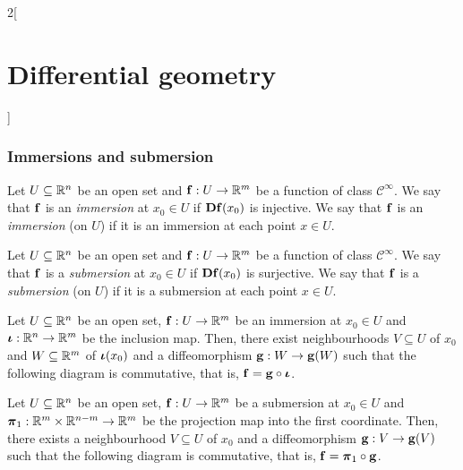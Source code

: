 \documentclass[../../../main.tex]{subfiles}
\begin{document}
\begin{multicols}{2}[\section{Differential geometry}]
  \subsubsection{Immersions and submersion}
  \begin{definition}[Immersion]
    Let $U\subseteq\mathbb{R}^n$ be an open set and $\boldsymbol{\mathrm{f}}:U\rightarrow \mathbb{R}^m$ be a function of class $\mathcal{C}^\infty$. We say that $\boldsymbol{\mathrm{f}}$ is an \emph{immersion} at $x_0\in U$ if $\boldsymbol{\mathrm{Df}}(x_0)$ is injective. We say that $\boldsymbol{\mathrm{f}}$ is an \emph{immersion} (on $U$) if it is an immersion at each point $x\in U$.
  \end{definition}
  \begin{definition}[Submersion]
    Let $U\subseteq\mathbb{R}^n$ be an open set and $\boldsymbol{\mathrm{f}}:U\rightarrow \mathbb{R}^m$ be a function of class $\mathcal{C}^\infty$. We say that $\boldsymbol{\mathrm{f}}$ is a \emph{submersion} at $x_0\in U$ if $\boldsymbol{\mathrm{Df}}(x_0)$ is surjective. We say that $\boldsymbol{\mathrm{f}}$ is a \emph{submersion} (on $U$) if it is a submersion at each point $x\in U$.
  \end{definition}
  \begin{theorem}
    Let $U\subseteq\mathbb{R}^n$ be an open set, $\boldsymbol{\mathrm{f}}:U\rightarrow \mathbb{R}^m$ be an immersion at $x_0\in U$ and $\boldsymbol{\mathrm{\iota}}:\mathbb{R}^n\rightarrow\mathbb{R}^m$ be the inclusion map. Then, there exist neighbourhoods $V\subseteq U$ of $x_0$ and $W\subseteq\mathbb{R}^m$ of $\boldsymbol{\mathrm{\iota}}(x_0)$ and a diffeomorphism $\boldsymbol{\mathrm{g}}:W\rightarrow \boldsymbol{\mathrm{g}}(W)$ such that the following diagram is commutative, that is, $\boldsymbol{\mathrm{f}}=\boldsymbol{\mathrm{g}}\circ\boldsymbol{\mathrm{\iota}}$.
    \begin{center}
      \begin{minipage}{\linewidth}
        \centering
        
      \end{minipage}
    \end{center}
  \end{theorem}
  \begin{theorem}
    Let $U\subseteq\mathbb{R}^n$ be an open set, $\boldsymbol{\mathrm{f}}:U\rightarrow \mathbb{R}^m$ be a submersion at $x_0\in U$ and $\boldsymbol{\mathrm{\pi}}_1:\mathbb{R}^m\times\mathbb{R}^{n-m}\rightarrow\mathbb{R}^m$ be the projection map into the first coordinate. Then, there exists a neighbourhood $V\subseteq U$ of $x_0$ and a diffeomorphism $\boldsymbol{\mathrm{g}}:V\rightarrow \boldsymbol{\mathrm{g}}(V)$ such that the following diagram is commutative, that is, $\boldsymbol{\mathrm{f}}=\boldsymbol{\mathrm{\pi}}_1\circ\boldsymbol{\mathrm{g}}$.
    \begin{center}
      \begin{minipage}{\linewidth}
        \centering
        
      \end{minipage}
    \end{center}
  \end{theorem}

\end{multicols}
\end{document}
